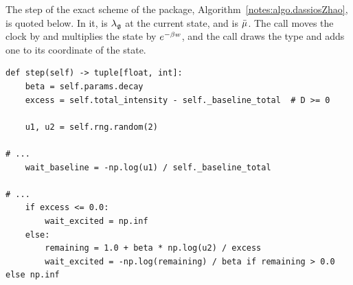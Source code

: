 \begin{question}
\label{question.exactWaitOnGivenUniforms}
The step of the exact scheme of the package, Algorithm~\ref{notes:algo.dassiosZhao}, is quoted below.
In it,  is $\lambda_{\mathfrak{g}}$ at the current state,
and  is $\bar{\mu}$.
The call  moves the clock by 
and multiplies the state by $e^{-\beta w}$,
and the call  draws the type
and adds one to its coordinate of the state.
\begin{lstlisting}[caption={\protect\codehl{unito26.lob.hawkes.ExponentialHawkes.step}, its comments elided.}, label=listing.exactWaitStep]
def step(self) -> tuple[float, int]:
    beta = self.params.decay
    excess = self.total_intensity - self._baseline_total  # D >= 0

    u1, u2 = self.rng.random(2)

# ...
    wait_baseline = -np.log(u1) / self._baseline_total

# ...
    if excess <= 0.0:
        wait_excited = np.inf
    else:
        remaining = 1.0 + beta * np.log(u2) / excess
        wait_excited = -np.log(remaining) / beta if remaining > 0.0 else np.inf


\end{lstlisting}
\end{question}
